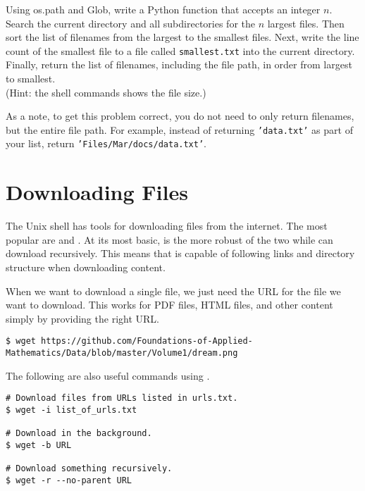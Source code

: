\begin{problem}
Using os.path and Glob, write a Python function that accepts an integer $n$.
Search the current directory and all subdirectories for the $n$ largest files.
Then sort the list of filenames from the largest to the smallest files.
Next, write the line count of the smallest file to a file called \texttt{smallest.txt} into the current directory.
Finally, return the list of filenames, including the file path, in order from largest to smallest.
\\(Hint: the shell commands  shows the file size.)

As a note, to get this problem correct, you do not need to only return filenames, but the entire file path. 
For example, instead of returning \texttt{'data.txt'} as part of your list, return \texttt{'Files/Mar/docs/data.txt'}.
\end{problem}

\section*{Downloading Files} %

The Unix shell has tools for downloading files from the internet.
The most popular are  and .
At its most basic,  is the more robust of the two while  can download recursively. 
This means that  is capable of following links and directory structure when downloading content.


When we want to download a single file, we just need the URL for the file we want to download.
This works for PDF files, HTML files, and other content simply by providing the right URL.

\begin{lstlisting}
$ wget https://github.com/Foundations-of-Applied-Mathematics/Data/blob/master/Volume1/dream.png
\end{lstlisting}

The following are also useful commands using .

\begin{lstlisting}
# Download files from URLs listed in urls.txt.
$ wget -i list_of_urls.txt

# Download in the background.
$ wget -b URL

# Download something recursively.
$ wget -r --no-parent URL
\end{lstlisting}

